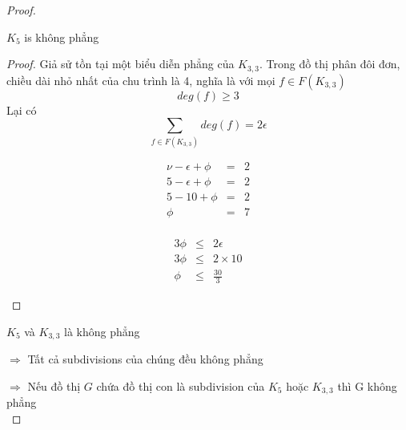 \begin{proof}
    \begin{lemma}
        $K_5$ is không phẳng
    \end{lemma}
    \begin{proof}
        Giả sử tồn tại một biểu diễn phẳng của $K_{3,3}$. Trong đồ thị phân đôi đơn, chiều dài nhỏ nhất của chu trình là 4, nghĩa là với mọi $f \in F(K_{3,3})$
        $$deg(f) \geq 3$$
        Lại có $$\sum_{f \in F(K_{3,3})}deg(f) = 2\epsilon$$
        \begin{figure}[H]
            \begin{minipage}{0.3\textwidth}
                \begin{eqnarray*}
                    \nu-\epsilon+\phi& = &2 \\
                    5-\epsilon+\phi& = & 2\\
                    5-10+\phi& = & 2\\
                    \phi& = & 7\\
                \end{eqnarray*}
            \end{minipage}
            \hfill
            \begin{minipage}{0.35\textwidth}
                \centering
            \end{minipage}
            \hfill
            \begin{minipage}{0.3\textwidth}
                \centering
                \begin{eqnarray*}
                    3\phi& \leq &2\epsilon\\
                    3\phi& \leq & 2 \times 10\\
                    \phi& \leq & \frac{30}{3}
                \end{eqnarray*}
            \end{minipage}
        \end{figure}
    \end{proof}
    \begin{recap}
    \end{recap}
    $K_5$ và $K_{3,3}$ là không phẳng

    $\Rightarrow$ Tất cả subdivisions của chúng đều không phẳng

    $\Rightarrow$ Nếu đồ thị $G$ chứa đồ thị con là subdivision của $K_5$ hoặc $K_{3,3}$ thì G không phẳng \\

\end{proof}

